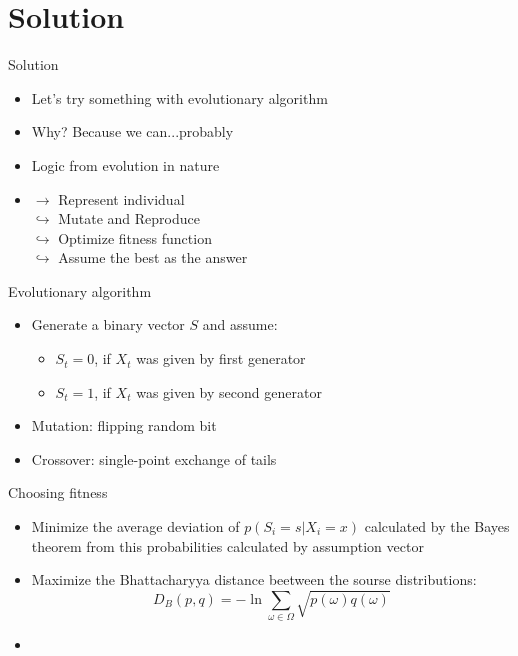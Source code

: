\documentclass[hyperref=unicode,graphics=pdflatex,13pt]{beamer}
\begin{document}
\section{Solution} %
\begin{frame}{Solution}
  \begin{itemize}
   \item Let's try something with evolutionary algorithm
   \item Why? Because we can...probably
   \item Logic from evolution in nature
   \item $\rightarrow$ Represent individual \\ $\hookrightarrow$ Mutate and Reproduce \\
   $\hookrightarrow$ Optimize fitness function  \\ $\hookrightarrow$ Assume the best as the answer
  \end{itemize}

\end{frame}

\begin{frame}{Evolutionary algorithm}
 \begin{itemize}
  \item Generate a binary vector $S$ and assume:
   \begin{itemize}
   \item $S_t = 0$, if $X_t$ was given by first generator
   \item $S_t = 1$, if $X_t$ was given by second generator
   \end{itemize}
  \item Mutation: flipping random bit
  \item Crossover: single-point exchange of tails
 \end{itemize}
\end{frame}

\begin{frame}{Choosing fitness}
\begin{itemize}
   \item Minimize the average deviation of $p(S_i=s | X_i = x)$ calculated by the Bayes theorem from this probabilities calculated by assumption vector
   \item Maximize the Bhattacharyya distance beetween the sourse distributions:
   $$D_B(p, q) = -\ln{\sum_{\omega \in \Omega} \sqrt{p(\omega)q(\omega)}}$$
   \item %
\end{itemize}

\end{frame}
\end{document}
